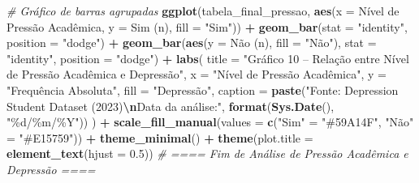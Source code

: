 \documentclass[
]{article}
\newenvironment{Shaded}{\begin{snugshade}}{\end{snugshade}}
\newcommand{\AttributeTok}[1]{\textcolor[rgb]{0.13,0.29,0.53}{#1}}
\newcommand{\CommentTok}[1]{\textcolor[rgb]{0.56,0.35,0.01}{\textit{#1}}}
\newcommand{\FloatTok}[1]{\textcolor[rgb]{0.00,0.00,0.81}{#1}}
\newcommand{\FunctionTok}[1]{\textcolor[rgb]{0.13,0.29,0.53}{\textbf{#1}}}
\newcommand{\NormalTok}[1]{#1}
\newcommand{\OtherTok}[1]{\textcolor[rgb]{0.56,0.35,0.01}{#1}}
\newcommand{\SpecialCharTok}[1]{\textcolor[rgb]{0.81,0.36,0.00}{\textbf{#1}}}
\newcommand{\StringTok}[1]{\textcolor[rgb]{0.31,0.60,0.02}{#1}}
\begin{document}
\begin{Shaded}
\begin{Highlighting}[]
\CommentTok{\# Gráfico de barras agrupadas}
\FunctionTok{ggplot}\NormalTok{(tabela\_final\_pressao, }\FunctionTok{aes}\NormalTok{(}\AttributeTok{x =} \StringTok{\textasciigrave{}}\AttributeTok{Nível de Pressão Acadêmica}\StringTok{\textasciigrave{}}\NormalTok{, }\AttributeTok{y =} \StringTok{\textasciigrave{}}\AttributeTok{Sim (n)}\StringTok{\textasciigrave{}}\NormalTok{, }\AttributeTok{fill =} \StringTok{"Sim"}\NormalTok{)) }\SpecialCharTok{+}
  \FunctionTok{geom\_bar}\NormalTok{(}\AttributeTok{stat =} \StringTok{"identity"}\NormalTok{, }\AttributeTok{position =} \StringTok{"dodge"}\NormalTok{) }\SpecialCharTok{+}
  \FunctionTok{geom\_bar}\NormalTok{(}\FunctionTok{aes}\NormalTok{(}\AttributeTok{y =} \StringTok{\textasciigrave{}}\AttributeTok{Não (n)}\StringTok{\textasciigrave{}}\NormalTok{, }\AttributeTok{fill =} \StringTok{"Não"}\NormalTok{), }\AttributeTok{stat =} \StringTok{"identity"}\NormalTok{, }\AttributeTok{position =} \StringTok{"dodge"}\NormalTok{) }\SpecialCharTok{+}
  \FunctionTok{labs}\NormalTok{(}
    \AttributeTok{title =} \StringTok{"Gráfico 10 – Relação entre Nível de Pressão Acadêmica e Depressão"}\NormalTok{,}
    \AttributeTok{x =} \StringTok{"Nível de Pressão Acadêmica"}\NormalTok{,}
    \AttributeTok{y =} \StringTok{"Frequência Absoluta"}\NormalTok{,}
    \AttributeTok{fill =} \StringTok{"Depressão"}\NormalTok{,}
    \AttributeTok{caption =} \FunctionTok{paste}\NormalTok{(}\StringTok{"Fonte: Depression Student Dataset (2023)}\SpecialCharTok{\textbackslash{}n}\StringTok{Data da análise:"}\NormalTok{, }\FunctionTok{format}\NormalTok{(}\FunctionTok{Sys.Date}\NormalTok{(), }\StringTok{"\%d/\%m/\%Y"}\NormalTok{))}
\NormalTok{  ) }\SpecialCharTok{+}
  \FunctionTok{scale\_fill\_manual}\NormalTok{(}\AttributeTok{values =} \FunctionTok{c}\NormalTok{(}\StringTok{"Sim"} \OtherTok{=} \StringTok{"\#59A14F"}\NormalTok{, }\StringTok{"Não"} \OtherTok{=} \StringTok{"\#E15759"}\NormalTok{)) }\SpecialCharTok{+}
  \FunctionTok{theme\_minimal}\NormalTok{() }\SpecialCharTok{+}
  \FunctionTok{theme}\NormalTok{(}\AttributeTok{plot.title =} \FunctionTok{element\_text}\NormalTok{(}\AttributeTok{hjust =} \FloatTok{0.5}\NormalTok{))}
\CommentTok{\# ==== Fim de Análise de Pressão Acadêmica e Depressão ====}


\end{Highlighting}
\end{Shaded}
\end{document}

